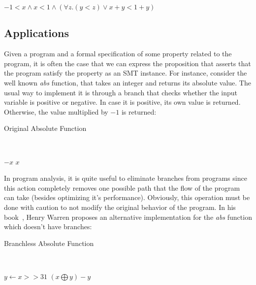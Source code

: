 \begin{center}
  $-1 < x \land x < 1 \land (\forall z . (y < z) \lor x + y < 1 + y)$
\end{center}



\subsection{Applications}

Given a program and a formal specification of some property related to the program, it is often  the case that we can express the proposition that asserts that the program satisfy the property as an SMT instance. For instance, consider the well known \textit{abs} function, that takes an integer and returns its absolute value. The usual way to implement it is through a branch that checks whether the input variable is positive or negative. In case it is positive, its own value is returned. Otherwise, the value multiplied by $-1$ is returned:

\begin{algorithm}
\caption{Original Absolute Function}~\label{originalAbs}
\begin{algorithmic}
  \State\Return$-x$
\Else
  \State\Return$x$
\EndIf
\EndFunction
\end{algorithmic}
\end{algorithm}

In program analysis, it is quite useful to eliminate branches from programs since this action completely removes one possible path that the flow of the program can take (besides optimizing it's performance). Obviously, this operation must be done with caution to not modify the original behavior of the program. In his book~\cite{hacker_delight}, Henry Warren proposes an alternative implementation for the \textit{abs} function which doesn't have branches:

\begin{algorithm}
\caption{Branchless Absolute Function}~\label{branchlessAbs}
\begin{algorithmic}
  \State $y \gets x >> 31$
  \State \Return $(x \bigoplus y) - y$
\EndFunction
\end{algorithmic}
\end{algorithm}

